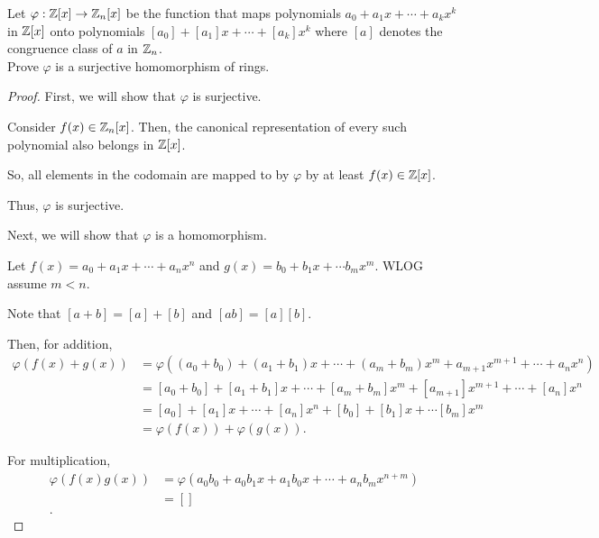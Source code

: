 \documentclass[../hw4]{subfiles}
\begin{document}
\begin{problem}
Let $\varphi:\mathbb{Z}[x]\to \mathbb{Z}_n[x]$ be the function that maps polynomials $a_0+a_1x+\cdots+a_kx^k$ in $\mathbb{Z}[x]$ onto polynomials $[a_0]+[a_1]x+\cdots+[a_k]x^k$ where $[a]$ denotes the congruence class of  $a$ in  $\mathbb{Z}_n$.\\
Prove $\varphi$ is a surjective homomorphism of rings.
\end{problem}
\begin{proof}
	First, we will show that $\varphi$ is surjective.

	Consider  $f(x) \in \mathbb{Z}_n[x]$.
	Then, the canonical representation of every such polynomial also belongs in $\mathbb{Z}[x]$.

	So, all elements in the codomain are mapped to by $\varphi$ by at least  $f(x)\in \mathbb{Z}[x]$.

	Thus, $\varphi$ is surjective.

	Next, we will show that  $\varphi$ is a homomorphism.

	Let  $f(x)=a_0+a_1x+\cdots+a_n x^n$ and $g(x)=b_0+b_1x+\cdots b_mx^m$. WLOG assume $m<n$.

	Note that $[a+b]=[a]+[b]$ and $[ab]=[a][b]$.

	Then, for addition,
	\begin{align*}
		\varphi(f(x)+g(x)) & = \varphi((a_0+b_0)+(a_1+b_1)x+\cdots+(a_m+b_m)x^m+a_{m+1}x^{m+1}+\cdots+a_nx^n) \\
		                   & = [a_0+b_0]+[a_1+b_1]x+\cdots+[a_m+b_m]x^m+[a_{m+1}]x^{m+1}+\cdots+[a_n]x^n      \\
		                   & = [a_0]+[a_1]x+\cdots+[a_n] x^n + [b_0]+[b_1]x+\cdots [b_m]x^m                   \\
		                   & = \varphi(f(x))+\varphi(g(x))
		.\end{align*}

	For multiplication,
	\begin{align*}
		\varphi(f(x)g(x)) & = \varphi(a_0b_0+a_0b_1x+a_1b_0x+\cdots+a_nb_mx^{n+m}) \\
		                  & = []                                                   \\
		.\end{align*}
\end{proof}
\end{document}

